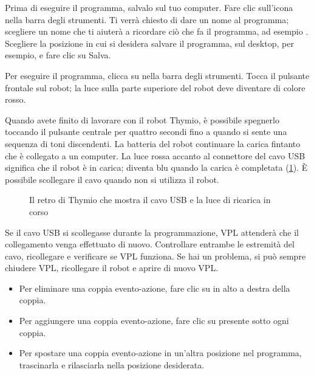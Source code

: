 
Prima di eseguire il programma, salvalo sul tuo computer.
Fare clic sull'icona 
nella barra degli strumenti. Ti verrà chiesto di dare un nome al programma; scegliere un
nome che ti aiuterà a ricordare ciò che fa il programma, ad esempio
.
Scegliere la posizione in cui si desidera salvare il programma, sul desktop, per esempio, e fare clic su Salva.



Per eseguire il programma, clicca su  nella barra degli strumenti. Tocca
il pulsante frontale sul robot; la luce sulla parte superiore del robot deve
diventare di colore rosso.



Quando avete finito di lavorare con il robot Thymio, è possibile spegnerlo
toccando il pulsante centrale per quattro secondi fino a quando
si sente una sequenza di toni discendenti. La batteria del robot
continuare la carica fintanto che è collegato a un computer. La
luce rossa accanto al connettore del cavo USB significa che il robot è in
carica; diventa blu quando la carica è completata (\cref{fig.back}).
È possibile scollegare il cavo quando non si utilizza il robot.


\begin{figure}
\begin{center}
\caption{Il retro di Thymio che mostra il cavo USB e la luce di ricarica in corso}\label{fig.back}
\end{center}
\end{figure}

Se il cavo USB si scollegasse durante la programmazione, VPL attenderà che il collegamento venga effettuato di nuovo.
Controllare entrambe le estremità del cavo, ricollegare e verificare se VPL funziona.
Se hai un problema, si può sempre chiudere VPL, ricollegare il robot e aprire di nuovo VPL.


\begin{itemize}
\item Per eliminare una coppia evento-azione, fare clic su  in alto a destra della coppia.
\item Per aggiungere una coppia evento-azione, fare clic su  presente sotto ogni coppia.
\item Per spostare una coppia evento-azione in un'altra posizione nel programma, trascinarla e rilasciarla nella posizione desiderata.
\end{itemize}

